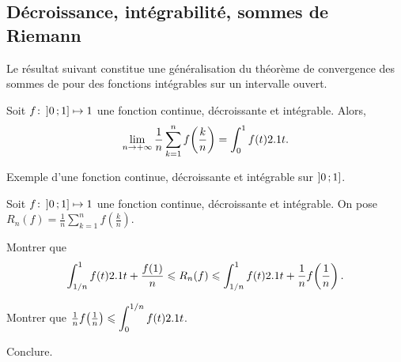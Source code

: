 

\subsection{Décroissance, intégrabilité, sommes de Riemann}

Le résultat suivant constitue une généralisation du théorème de convergence des sommes de  pour des fonctions intégrables sur un intervalle ouvert.

\begin{prop}
    Soit $\fonctionligne[f]{\interof{0}{1}}{\R}$ une fonction continue, décroissante et intégrable. Alors,
    \[
    \lim\limits_{n \to +\infty} \frac{1}{n} \sum\limits_{k=1}^n f\mathopen{}\left(\frac{k}{n}\right) =\int_0^1 f(t) \d t.
    \]
\end{prop}

\begin{marginfigure}
    \centering
    
    \caption{Exemple d'une fonction continue, décroissante et intégrable sur $\interof{0}{1}$.}
\end{marginfigure}

\begin{exercice}
Soit $\fonctionligne[f]{\interof{0}{1}}{\R}$ une fonction continue, décroissante et intégrable. On pose \mbox{$R_n(f) = \frac{1}{n} \sum\limits_{k=1}^n f\mathopen{}\left(\frac{k}{n}\right)$}.
\begin{questions}
\item Montrer que
\[
\displaystyle\int_{1/n}^1 f(t) \d t + \frac{f(1)}{n}
\leqslant R_n(f)
\leqslant \displaystyle\int_{1/n}^1 f(t) \d t + \frac{1}{n}  f\mathopen{}\left(\frac{1}{n}\right).
\]

\item Montrer que $\frac{1}{n} f\mathopen{}\left(\frac{1}{n}\right) \leqslant \displaystyle\int_0^{1/n} f(t) \d t$.

\item Conclure.
\end{questions}
\end{exercice}



